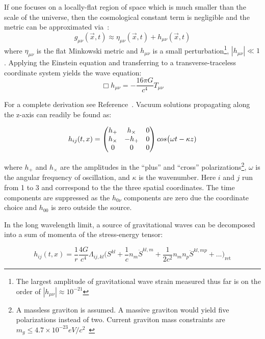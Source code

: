 \documentclass [12pt, proquest]{uwthesis}[2019]
\begin{document}
If one focuses on a locally-flat region of space which is much smaller than the scale of the universe, then the cosmological constant term is negligible and the metric can be approximated via~\cite{GWBook}:
\begin{equation}
g_{\mu \nu}(\vec x,t)\approx\eta_{\mu \nu}(\vec x,t)+h_{\mu \nu}(\vec x,t)
\end{equation}
where $\eta_{\mu \nu}$ is the flat Minkowski metric and $h_{\mu \nu}$ is a small perturbation\footnote{The largest amplitude of gravitational wave strain measured thus far is on the order of $|h_{\mu \nu}|\approx 10^{-21}$\cite{GW150914}}, $|h_{\mu \nu}|\ll 1$. Applying the Einstein equation and transferring to a transverse-traceless coordinate system yields the wave equation:
\begin{equation}
\Box h_{\mu \nu}=-\frac{16 \pi G}{c^4}T_{\mu \nu}
\end{equation}

For a complete derivation see Reference~\cite{GWBook}. Vacuum solutions propagating along the z-axis can readily be found as:

\begin{equation}
h_{ij}(t,x)=\begin{pmatrix} h_+ & h_\times & 0 \\ h_\times & -h_+ & 0 \\ 0 & 0 & 0\end{pmatrix} \\cos\big(\omega t - \kappa z)
\end{equation}

where $h_+$ and $h_\times$ are the amplitudes in the ``plus'' and ``cross'' polarizations\footnote{A massless graviton is assumed. A massive graviton would yield five polarizations instead of two. Current graviton mass constraints are $m_g\leq 4.7\times 10^{-23} eV/c^2$~\cite{graviton}}, $\omega$ is the angular frequency of oscillation, and $\kappa$ is the wavenumber. Here $i$ and $j$ run from 1 to 3 and correspond to the the three spatial coordinates. The time components are suppressed as the $h_{0\nu}$ components are zero due the coordinate choice and $h_{00}$ is zero outside the source. 

In the long wavelength limit, a source of gravitational waves can be decomposed into a sum of momenta of the stress-energy tensor:

\begin{equation}
h_{ij}(t,x)=\frac{1}{r}\frac{4 G}{c^4} \Lambda_{ij,kl} \bigg( S^{kl} +\frac{1}{c} n_m \dot{S}^{kl,m} +\frac{1}{2c^2} n_m n_p \ddot{S}^{kl,mp}+...\bigg)_\text{ret} \label{gwExp}
\end{equation}
\end{document}
